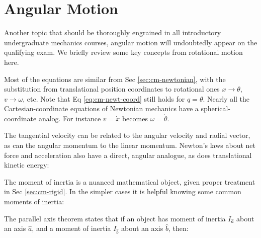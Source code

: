 \section{Angular Motion}
\label{sec:cm-angular}
Another topic that should be thoroughly engrained in all introductory undergraduate mechanics courses, angular motion will undoubtedly appear on the qualifying exam. We briefly review some key concepts from rotational motion here.

Most of the equations are similar from Sec \ref{sec:cm-newtonian}, with the substitution from translational position coordinates to rotational ones $x \rightarrow \theta$, $v\rightarrow \omega$, etc. Note that Eq \ref{eq:cm-newt-coord} still holds for $q=\theta$. Nearly all the Cartesian-coordinate equations of Newtonian mechanics have a spherical-coordinate analog. For instance $v = \dot{x}$ becomes $\omega = \dot{\theta}$.


The tangential velocity can be related to the angular velocity and radial vector, as can the angular momentum to the linear momentum. Newton's laws about net force and acceleration also have a direct, angular analogue, as does translational kinetic energy:




The moment of inertia is a nuanced mathematical object, given proper treatment in Sec \ref{sec:cm-rigid}. In the simpler cases it is helpful knowing some common moments of inertia:


The parallel axis theorem states that if an object has moment of inertia $I_{\hat{a}}$ about an axis $\hat{a}$, and a moment of inertia $I_{\hat{b}}$ about an axis $\hat{b}$, then: 

